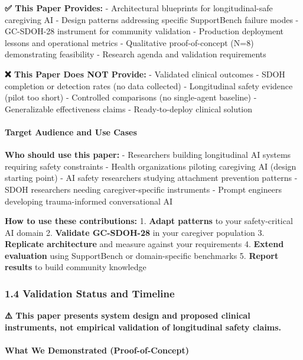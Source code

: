 \documentclass[
]{article}
\begin{document}
\textbf{✅ This Paper Provides:} - Architectural blueprints for
longitudinal-safe caregiving AI - Design patterns addressing specific
SupportBench failure modes - GC-SDOH-28 instrument for community
validation - Production deployment lessons and operational metrics -
Qualitative proof-of-concept (N=8) demonstrating feasibility - Research
agenda and validation requirements

\textbf{❌ This Paper Does NOT Provide:} - Validated clinical outcomes -
SDOH completion or detection rates (no data collected) - Longitudinal
safety evidence (pilot too short) - Controlled comparisons (no
single-agent baseline) - Generalizable effectiveness claims -
Ready-to-deploy clinical solution

\paragraph{Target Audience and Use
Cases}\label{target-audience-and-use-cases}

\textbf{Who should use this paper:} - Researchers building longitudinal
AI systems requiring safety constraints - Health organizations piloting
caregiving AI (design starting point) - AI safety researchers studying
attachment prevention patterns - SDOH researchers needing
caregiver-specific instruments - Prompt engineers developing
trauma-informed conversational AI

\textbf{How to use these contributions:} 1. \textbf{Adapt patterns} to
your safety-critical AI domain 2. \textbf{Validate GC-SDOH-28} in your
caregiver population 3. \textbf{Replicate architecture} and measure
against your requirements 4. \textbf{Extend evaluation} using
SupportBench or domain-specific benchmarks 5. \textbf{Report results} to
build community knowledge

\subsubsection{1.4 Validation Status and
Timeline}\label{validation-status-and-timeline}

\textbf{⚠️ This paper presents system design and proposed clinical
instruments, not empirical validation of longitudinal safety claims.}

\paragraph{What We Demonstrated
(Proof-of-Concept)}\label{what-we-demonstrated-proof-of-concept}
\end{document}
